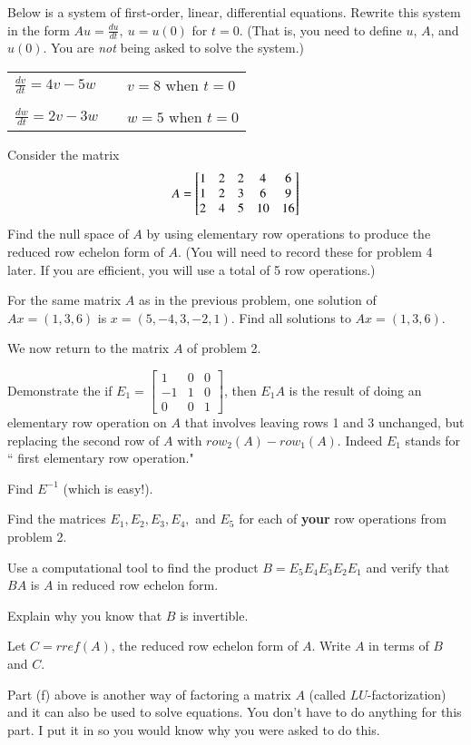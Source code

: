 \documentclass[minion]{homework}
\newcommand{\bbm}{\begin{bmatrix}}
\newcommand{\ebm}{\end{bmatrix}}
\begin{document}
\begin{problems}

\problem Below is a system of first-order, linear, differential equations. Rewrite this system in the form $Au=\frac{du}{dt}, \: u=u(0)$ for $t=0.$ (That is, you need to define $u$, $A$, and $u(0).$ You are \emph{not} being asked to solve the system.)

\begin{tabular}{lll}
$\frac{dv}{dt}=4v-5w$&\quad& $v=8$ when $t=0$\\
&&\\
$\frac{dw}{dt}=2v-3w$&\quad& $w=5$ when $t=0$\\
\end{tabular}

    \problem Consider the matrix 
    \[
A = \begin{bmatrix}
    1 &2 &2 &4 & 6\cr
    1 &2 &3 &6 &9\cr
    2 &4 &5 &10 &16   
\end{bmatrix}
\]
Find the null space of $A$ by using elementary row operations to produce the reduced row echelon form of $A.$ (You will need to record these for problem 4 later. If you are efficient, you will use a total of 5 row operations.)
 
 \problem For the same matrix $A$ as in the previous problem,
    one solution of $Ax=(1,3,6)$ is $x=(5,-4,3,-2,1)$.  Find
    all solutions to $Ax=(1,3,6).$

 \problem We now return to the matrix $A$ of problem 2. 
	\begin{subproblems}
	\item Demonstrate the if $E_1=\bbm 1&0&0\\-1&1&0\\0&0&1\ebm$, then $E_1A$ is the result of doing an elementary row operation on $A$ that involves leaving rows 1 and 3 unchanged, but replacing the second row of $A$ with $row_2(A)-row_1(A)$. Indeed $E_1$ stands for `` first elementary row operation."
	\item Find $E^{-1}$ (which is easy!). 
	\item Find the matrices $E_1,E_2,E_3,E_4,$ and $E_5$ for each of \textbf{your} row operations from problem 2.
	\item Use a computational tool to find the product $B=E_5E_4E_3E_2E_1$ and verify that $BA$ is $A$ in reduced row echelon form.
	\item Explain why you know that $B$ is invertible.
	\item Let $C=rref(A)$, the reduced row echelon form of $A.$ Write $A$ in terms of $B$ and $C.$ 
	\item Part (f) above is another way of factoring a matrix $A$ (called $LU$-factorization) and it can also be used to solve equations. You don't have to do anything for this part. I put it in so you would know why you were asked to do this.
	\end{subproblems}


\end{problems}
\end{document}
